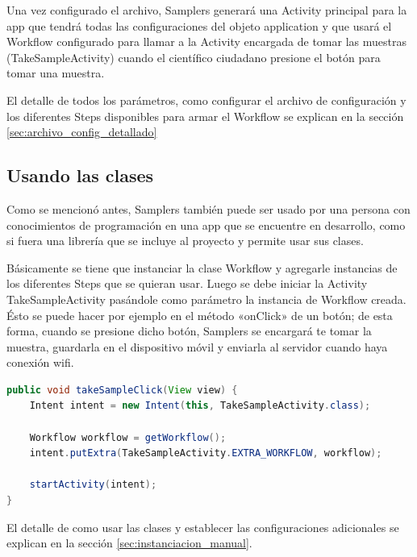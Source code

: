 Una vez configurado el archivo, Samplers generará una Activity principal para la app que tendrá todas las configuraciones del objeto application y que usará el Workflow configurado para llamar a la Activity encargada de tomar las muestras (TakeSampleActivity) cuando el científico ciudadano presione el botón para tomar una muestra.

El detalle de todos los parámetros, como configurar el archivo de configuración y los diferentes Steps disponibles para armar el Workflow se explican en la sección \ref{sec:archivo_config_detallado}


\subsection{Usando las clases} \label{sec:usando_las_clases}
Como se mencionó antes, Samplers también puede ser usado por una persona con conocimientos de programación en una app que se encuentre en desarrollo, como si fuera una librería que se incluye al proyecto y permite usar sus clases. 

Básicamente se tiene que instanciar la clase Workflow y agregarle instancias de los diferentes Steps que se quieran usar. Luego se debe  iniciar la Activity TakeSampleActivity pasándole como parámetro la instancia de Workflow creada. Ésto se puede hacer por ejemplo en el método «onClick» de un botón; de esta forma, cuando se presione dicho botón, Samplers se encargará te tomar la muestra, guardarla en el dispositivo móvil y enviarla al servidor cuando haya conexión wifi.

\clearpage
\begin{lstlisting}[language=Java, frame=tlbr, caption=Ejemplo de como iniciar la activity TakeSampleActivity instanciando las clases.]
public void takeSampleClick(View view) {
	Intent intent = new Intent(this, TakeSampleActivity.class);  
	
	Workflow workflow = getWorkflow();       
	intent.putExtra(TakeSampleActivity.EXTRA_WORKFLOW, workflow);
	
	startActivity(intent);
}		
\end{lstlisting}

El detalle de como usar las clases y establecer las configuraciones adicionales se explican en la sección \ref{sec:instanciacion_manual}.

